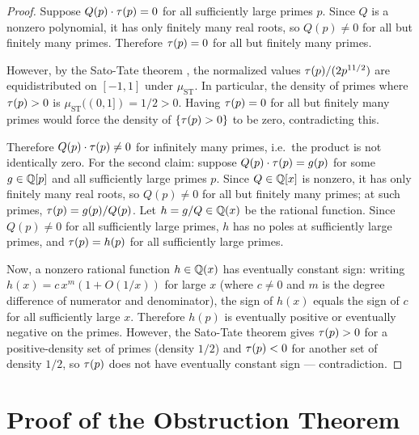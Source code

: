 \documentclass[11pt]{article}
\begin{document}
\begin{proof}
Suppose $Q(p)\cdot\tau(p) = 0$ for all sufficiently large primes $p$.
Since $Q$ is a nonzero polynomial, it has only finitely many real roots, so $Q(p)\ne 0$
for all but finitely many primes.
Therefore $\tau(p)=0$ for all but finitely many primes.

However, by the Sato-Tate theorem \cite{BLGHT2011}, the normalized values
$\tau(p)/(2p^{11/2})$ are equidistributed on $[-1,1]$ under $\mu_{\mathrm{ST}}$.
In particular, the density of primes where $\tau(p)>0$ is $\mu_{\mathrm{ST}}((0,1])=1/2>0$.
Having $\tau(p)=0$ for all but finitely many primes would force the density of
$\{\tau(p)>0\}$ to be zero, contradicting this.

Therefore $Q(p)\cdot\tau(p)\ne 0$ for infinitely many primes, i.e.\ the product is not
identically zero.
For the second claim: suppose $Q(p)\cdot\tau(p)=g(p)$ for some $g\in\mathbb{Q}[p]$ and all
sufficiently large primes $p$.
Since $Q\in\mathbb{Q}[x]$ is nonzero, it has only finitely many real roots, so $Q(p)\ne 0$ for
all but finitely many primes; at such primes, $\tau(p) = g(p)/Q(p)$.
Let $h = g/Q\in\mathbb{Q}(x)$ be the rational function.
Since $Q(p)\ne 0$ for all sufficiently large primes, $h$ has no poles at sufficiently
large primes, and $\tau(p) = h(p)$ for all sufficiently large primes.

Now, a nonzero rational function $h\in\mathbb{Q}(x)$ has eventually constant sign: writing
$h(x) = c\,x^m(1+O(1/x))$ for large $x$ (where $c\ne 0$ and $m$ is the
degree difference of numerator and denominator), the sign of $h(x)$ equals the sign of
$c$ for all sufficiently large $x$.
Therefore $h(p)$ is eventually positive or eventually negative on the primes.
However, the Sato-Tate theorem \cite{BLGHT2011} gives $\tau(p)>0$ for a positive-density
set of primes (density $1/2$) and $\tau(p)<0$ for another set of density $1/2$, so
$\tau(p)$ does not have eventually constant sign — contradiction.
\end{proof}

\section{Proof of the Obstruction Theorem}
\label{sec:proof}
\end{document}
